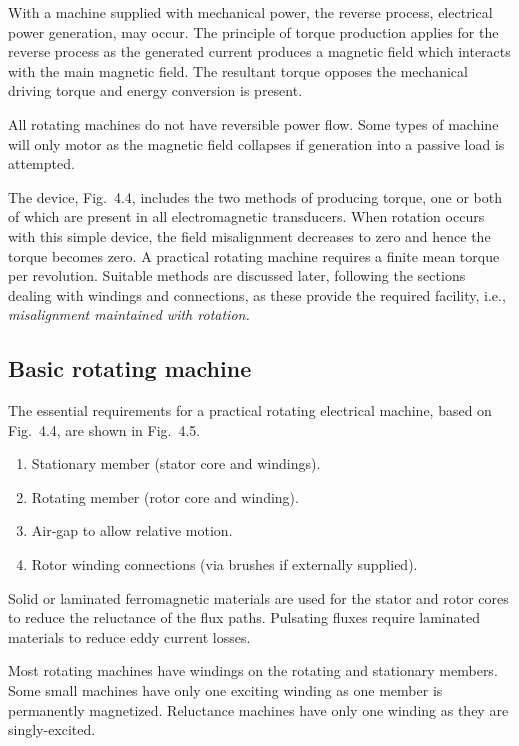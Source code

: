 \documentclass[a4paper,numbers=noenddot,12pt]{scrbook}
\begin{document}
            With a machine supplied with mechanical power, the reverse process, electrical power generation, may occur. The principle of torque production applies for the reverse process as the generated current produces a magnetic field which interacts with the main magnetic field. The resultant torque opposes the mechanical driving torque and energy conversion is present.

            All rotating machines do not have reversible power flow. Some types of machine will only motor as the magnetic field collapses if generation into a passive load is attempted. 

            The device, Fig.\ 4.4, includes the two methods of producing torque, one or both of which are present in all electromagnetic transducers. When rotation occurs with this simple device, the field misalignment decreases to zero and hence the torque becomes zero. A practical rotating machine requires a finite mean torque per revolution. Suitable methods are discussed later, following the sections dealing with windings and connections, as these provide the required facility, i.e., \textit{misalignment maintained with rotation.}

            \subsection{Basic rotating machine}
            The essential requirements for a practical rotating electrical machine, based on Fig.\ 4.4, are shown in Fig.\ 4.5. 
            \begin{enumerate}
                \item Stationary member (stator core and windings).
                \item Rotating member (rotor core and winding).
                \item Air-gap to allow relative motion. 
                \item Rotor winding connections (via brushes if externally supplied). 
            \end{enumerate}

            Solid or laminated ferromagnetic materials are used for the stator and rotor cores to reduce the reluctance of the flux paths. Pulsating fluxes require laminated materials to reduce eddy current losses.

            Most rotating machines have windings on the rotating and stationary members. Some small machines have only one exciting winding as one member is permanently magnetized. Reluctance machines have only one winding as they are singly-excited.
\end{document}
